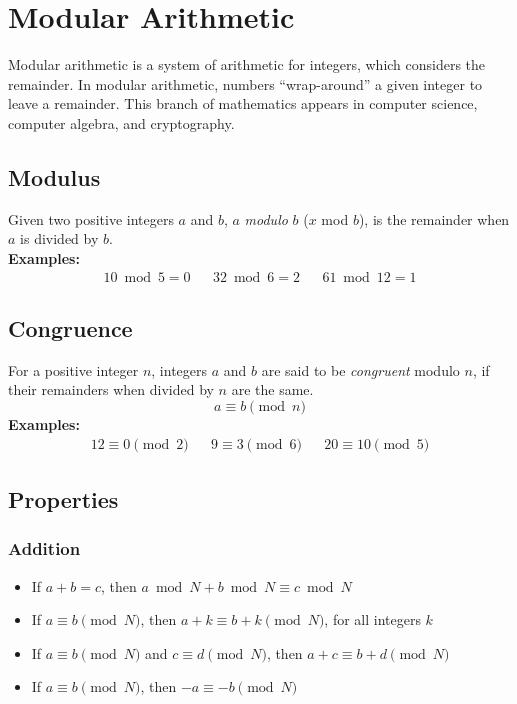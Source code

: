 \documentclass[12pt]{article}
\begin{document}
\section{Modular Arithmetic}
Modular arithmetic is a system of arithmetic for integers, which considers the remainder. In modular arithmetic, numbers ``wrap-around'' a given integer to leave a remainder. This branch of mathematics appears in computer science, computer algebra, and cryptography.

\subsection{Modulus}
Given two positive integers $a$ and $b$, $a$ \textit{modulo} $b$ ($x$ mod $b$), is the remainder when $a$ is divided by $b$. \\

\textbf{Examples:}
\begin{align*}
    10 \bmod 5 = 0 && 32 \bmod 6 = 2 && 61 \bmod 12 = 1
\end{align*}

\subsection{Congruence}
For a positive integer $n$, integers $a$ and $b$ are said to be \textit{congruent} modulo $n$, if their remainders when divided by $n$ are the same. $$a \equiv b \pmod n$$
\textbf{Examples:}
\begin{align*}
    12 \equiv 0 \pmod 2 && 9 \equiv 3 \pmod 6 && 20 \equiv 10 \pmod 5
\end{align*}

\subsection{Properties}
\subsubsection{Addition}
\begin{itemize}
    \item If $a + b = c$, then $a \bmod N + b \bmod N \equiv c \bmod N$
    \item If $a \equiv b \pmod N$, then $a + k \equiv b + k \pmod N$, for all integers $k$
    \item If $a \equiv b \pmod N$ and $c \equiv d \pmod N$, then $a + c \equiv b + d \pmod N$
    \item If $a \equiv b \pmod N$, then $-a \equiv -b \pmod N$
\end{itemize}
\end{document}
